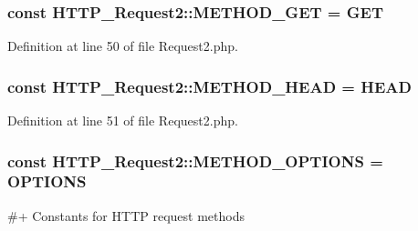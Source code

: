 \subsubsection[{\texorpdfstring{M\+E\+T\+H\+O\+D\+\_\+\+G\+ET}{METHOD_GET}}]{\setlength{\rightskip}{0pt plus 5cm}const H\+T\+T\+P\+\_\+\+Request2\+::\+M\+E\+T\+H\+O\+D\+\_\+\+G\+ET = \textquotesingle{}G\+ET\textquotesingle{}}\hypertarget{classHTTP__Request2_a7c1f37cc2543c9d0fe5f09086bd50b3a}{}\label{classHTTP__Request2_a7c1f37cc2543c9d0fe5f09086bd50b3a}


Definition at line 50 of file Request2.\+php.

\subsubsection[{\texorpdfstring{M\+E\+T\+H\+O\+D\+\_\+\+H\+E\+AD}{METHOD_HEAD}}]{\setlength{\rightskip}{0pt plus 5cm}const H\+T\+T\+P\+\_\+\+Request2\+::\+M\+E\+T\+H\+O\+D\+\_\+\+H\+E\+AD = \textquotesingle{}H\+E\+AD\textquotesingle{}}\hypertarget{classHTTP__Request2_abb68a728946a9da5f19d5bb0cf676d58}{}\label{classHTTP__Request2_abb68a728946a9da5f19d5bb0cf676d58}


Definition at line 51 of file Request2.\+php.

\subsubsection[{\texorpdfstring{M\+E\+T\+H\+O\+D\+\_\+\+O\+P\+T\+I\+O\+NS}{METHOD_OPTIONS}}]{\setlength{\rightskip}{0pt plus 5cm}const H\+T\+T\+P\+\_\+\+Request2\+::\+M\+E\+T\+H\+O\+D\+\_\+\+O\+P\+T\+I\+O\+NS = \textquotesingle{}O\+P\+T\+I\+O\+NS\textquotesingle{}}\hypertarget{classHTTP__Request2_a65c57cec36149d220f6cd30d43eb59b7}{}\label{classHTTP__Request2_a65c57cec36149d220f6cd30d43eb59b7}
\#+ Constants for H\+T\+TP request methods


